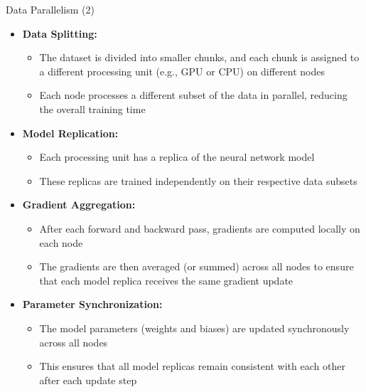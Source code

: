 \begin{vbframe}{Data Parallelism (2)}
\begin{itemize}
    \item \textbf{Data Splitting:}
        \begin{itemize}
            \item The dataset is divided into smaller chunks, and each chunk is assigned to a different processing unit (e.g., GPU or CPU) on different nodes
            \item Each node processes a different subset of the data in parallel, reducing the overall training time    
        \end{itemize}
    \item \textbf{Model Replication:}
        \begin{itemize}
            \item Each processing unit has a replica of the neural network model
            \item These replicas are trained independently on their respective data subsets
        \end{itemize}
    \item \textbf{Gradient Aggregation:}
        \begin{itemize}
            \item After each forward and backward pass, gradients are computed locally on each node 
            \item The gradients are then averaged (or summed) across all nodes to ensure that each model   replica receives the same gradient update     
        \end{itemize}
    \item \textbf{Parameter Synchronization:}
        \begin{itemize}
            \item The model parameters (weights and biases) are updated synchronously across all nodes
            \item This ensures that all model replicas remain consistent with each other after each update step    
        \end{itemize}
\end{itemize}

\end{vbframe}


